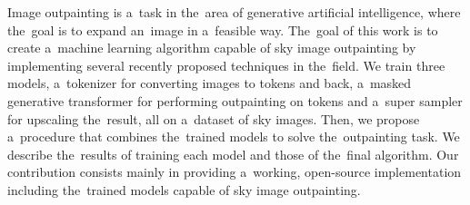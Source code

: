 \documentclass[12pt]{report}
\begin{document}

Image outpainting is a~task in the~area of generative artificial intelligence, where the~goal is to expand an~image in a~feasible way. The~goal of this work is to create a~machine learning algorithm capable of sky image outpainting by implementing several recently proposed techniques in the~field. We train three models, a~tokenizer for converting images to tokens and back, a~masked generative transformer for performing outpainting on tokens and a~super sampler for upscaling the~result, all on a~dataset of sky images. Then, we propose a~procedure that combines the~trained models to solve the~outpainting task. We describe the~results of training each model and those of the~final algorithm. Our contribution consists mainly in providing a~working, open-source implementation including the~trained models capable of sky image outpainting.
\end{document}
